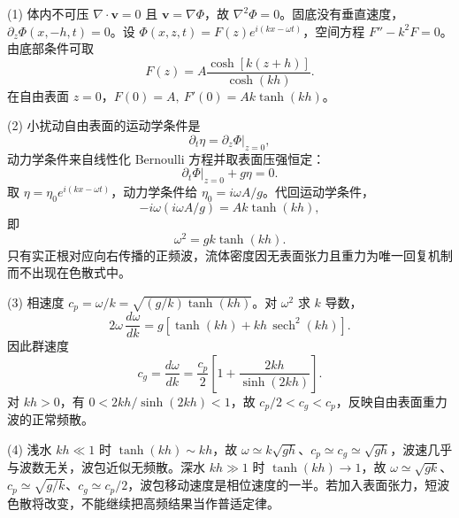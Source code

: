 (1) 体内不可压 \(\nabla\cdot\boldsymbol v=0\) 且 \(\boldsymbol v=\nabla\Phi\)，故 \(\nabla^2\Phi=0\)。固底没有垂直速度，\(\partial_z\Phi(x,-h,t)=0\)。设 \(\Phi(x,z,t)=F(z)e^{i(kx-\omega t)}\)，空间方程 \(F''-k^2F=0\)。由底部条件可取
\[
F(z)=A\frac{\cosh[k(z+h)]}{\cosh(kh)}.
\]
在自由表面 \(z=0\)，\(F(0)=A,\ F'(0)=Ak\tanh(kh)\)。

(2) 小扰动自由表面的运动学条件是
\[
\partial_t\eta=\partial_z\Phi|_{z=0},
\]
动力学条件来自线性化 Bernoulli 方程并取表面压强恒定：
\[
\partial_t\Phi|_{z=0}+g\eta=0.
\]
取 \(\eta=\eta_0 e^{i(kx-\omega t)}\)，动力学条件给 \(\eta_0=i\omega A/g\)。代回运动学条件，
\[
-i\omega(i\omega A/g)=Ak\tanh(kh),
\]
即
\[
\boxed{\omega^2=gk\tanh(kh)}.
\]
只有实正根对应向右传播的正频波，流体密度因无表面张力且重力为唯一回复机制而不出现在色散式中。

(3) 相速度 \(c_p=\omega/k=\sqrt{(g/k)\tanh(kh)}\)。对 \(\omega^2\) 求 \(k\) 导数，
\[
2\omega\,\frac{d\omega}{dk}
=g[\tanh(kh)+kh\,\operatorname{sech}^2(kh)].
\]
因此群速度
\[
c_g=\frac{d\omega}{dk}
=\frac{c_p}{2}\left[1+\frac{2kh}{\sinh(2kh)}\right].
\]
对 \(kh>0\)，有 \(0<2kh/\sinh(2kh)<1\)，故 \(c_p/2<c_g<c_p\)，反映自由表面重力波的正常频散。

(4) 浅水 \(kh\ll1\) 时 \(\tanh(kh)\sim kh\)，故 \(\omega\simeq k\sqrt{gh}\)、\(c_p\simeq c_g\simeq\sqrt{gh}\)，波速几乎与波数无关，波包近似无频散。深水 \(kh\gg1\) 时 \(\tanh(kh)\to1\)，故 \(\omega\simeq\sqrt{gk}\)、\(c_p\simeq\sqrt{g/k}\)、\(c_g\simeq c_p/2\)，波包移动速度是相位速度的一半。若加入表面张力，短波色散将改变，不能继续把高频结果当作普适定律。
